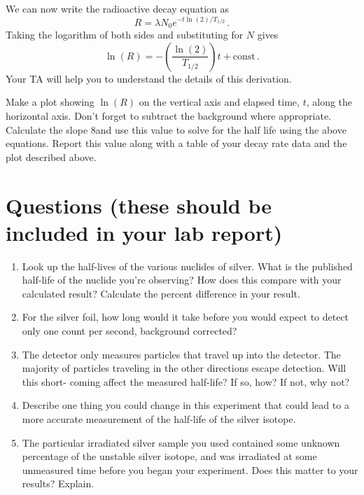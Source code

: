 We can now write the radioactive decay equation as
\begin{equation}
 R = \lambda N_0 e^{-t \ln(2) / T_{1/2}} \,.
\end{equation}
Taking the logarithm of both sides and substituting for $N$ gives
\begin{equation}
 \ln(R) = - \left(\frac{\ln(2)}{T_{1/2}} \right) t + \mathrm{const} \,.
\end{equation}
Your TA will help you to understand the details of this derivation.

Make a plot showing $\ln(R)$ on the vertical axis and elapsed time, $t$, along the horizontal
axis. Don’t forget to subtract the background where appropriate. Calculate the slope
8and use this value to solve for the half life using the above equations. Report this value
along with a table of your decay rate data and the plot described above.

\section{Questions (these should be included in your lab report)}

\begin{enumerate}
	\item Look up the half-lives of the various nuclides of silver. What is the published
	half-life of the nuclide you’re observing? How does this compare with your
	calculated result? Calculate the percent difference in your result.
	
	\item For the silver foil, how long would it take before you would expect to detect only
	one count per second, background corrected?
	
	\item The detector only measures particles that travel up into the detector. The majority
	of particles traveling in the other directions escape detection. Will this short-
	coming affect the measured half-life? If so, how? If not, why not?
	
	\item Describe one thing you could change in this experiment that could lead to a more
	accurate measurement of the half-life of the silver isotope.
	
	\item The particular irradiated silver sample you used contained some unknown
	percentage of the unstable silver isotope, and was irradiated at some unmeasured
	time before you began your experiment. Does this matter to your results? Explain.
	
\end{enumerate}